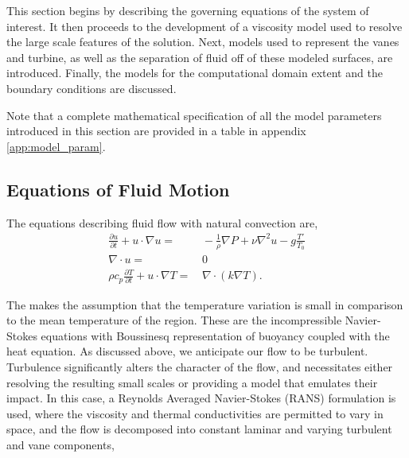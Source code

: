This section begins by describing the governing equations of the system
of interest. It then proceeds to the development of a viscosity model
used to resolve the large scale features of the solution. Next, models
used to represent the vanes and turbine, as well as the separation of
fluid off of these modeled surfaces, are introduced.  Finally, the
models for the computational domain extent and the boundary conditions
are discussed. 

Note that a complete mathematical specification of all the model
parameters introduced in this section are provided in a table in
appendix \ref{app:model_param}.

\subsection{Equations of Fluid Motion}
\label{sub_sec:ns_en}
%
%

The equations describing fluid flow with natural convection are,
\begin{align}
  \frac{\partial u}{\partial t} + u \cdot \nabla u =& \,
  -\frac{1}{\rho}\nabla P + \nu \nabla^2 u - g \frac{T'}{T_0}\\
  \nabla \cdot u =& \, 0 \\
  \rho c_p \frac{\partial T}{\partial t} + u \cdot \nabla T =& \, \nabla
 \cdot ( k \nabla T). 
\end{align} 

The makes the assumption that the temperature variation is small in
comparison to the mean temperature of the region. These are the
incompressible Navier-Stokes equations with Boussinesq representation of
buoyancy coupled with the heat equation.  
%
%
%
As discussed above, we anticipate our flow to be
turbulent. Turbulence significantly alters the character of the flow,
and necessitates either resolving the resulting small scales or
providing a model that emulates their impact. In this case, a
Reynolds Averaged Navier-Stokes (RANS) formulation is used, where the 
viscosity and thermal conductivities are permitted to vary in space, and
the flow is decomposed into constant laminar and varying turbulent and vane
components,  


